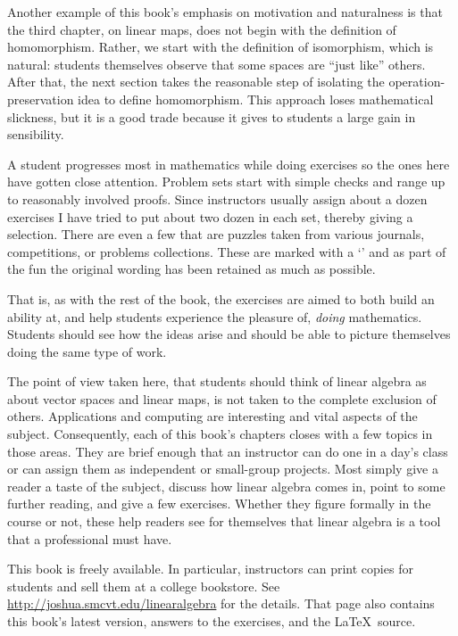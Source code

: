 Another example of this book's emphasis on motivation and naturalness
is that the third chapter, on linear maps,
does not begin with the definition of homomorphism.
Rather, we start with the definition of isomorphism, which
is natural: students themselves
observe that some spaces are ``just like'' others.
After that,
the next section takes the reasonable step of 
isolating the operation-preservation idea
to define homomorphism.
This approach loses mathematical slickness, 
but it is a good trade because it gives to students
a large gain in sensibility.

A student progresses most in mathematics while doing exercises so the ones
here have gotten close attention.
Problem sets start with 
simple checks and range up to reasonably involved proofs.
Since instructors usually assign about a dozen exercises
I have tried to put about two dozen in each set, 
thereby giving a selection.
There are even a few that are puzzles
taken from various journals, competitions, or
problems collections. 
These are marked with a
`\puzzlemark' and 
as part of the fun the original wording
has been retained as much as possible.

That is, as with the rest of the book, 
the exercises are aimed to both build an ability at,
and help students experience the pleasure of, 
\emph{doing} mathematics.
Students should see how the ideas arise and should be able to 
picture themselves doing the same type of work.


\medskip
{}
The point of view taken here, that students should think of 
linear algebra as about vector spaces
and linear maps, is not taken to the complete exclusion of others.
Applications and computing are interesting and vital aspects 
of the subject.
Consequently, each of this book's chapters closes with a few 
topics in those areas.
They are brief enough that an instructor can do one
in a day's class 
or can assign them as independent or small-group projects.
Most simply give a reader
a taste of the subject, discuss how linear algebra comes in,
point to some further reading, and give a few exercises. 
Whether they figure formally in the course or not, these help
readers see for themselves that linear algebra is a tool
that a professional must have. 




\medskip
{}
This book is freely available.
In particular, instructors can print copies for students 
and sell them at a college bookstore.
See 
\url{http://joshua.smcvt.edu/linearalgebra}
for the details.
That page also contains this book's latest version,
answers to the exercises, and the \LaTeX\ source.

